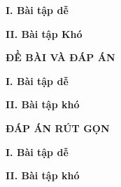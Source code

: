 \documentclass[12pt]{article}
\begin{document}
\setlength{\baselineskip}{12truept}
\def\v#1{\overrightarrow{#1}} %

% 
\lamtieude

\indebai

\textbf{I. Bài tập dễ}
\begin{enumerate}[]
\foreachproblem[dtracnghiem]{\item\causo\thisproblem}

 \textbf{II. Bài tập Khó}

\foreachproblem[ktracnghiem]{\item\causo\thisproblem}
\end{enumerate}
\label{dbPage}

\newpage
\setcounter{page}{1}
\lamtieude
\begin{center}
{\bf ĐỀ BÀI VÀ ĐÁP ÁN }
\end{center}
\indebaidapan

\textbf{I. Bài tập dễ}
\begin{enumerate}[]
\foreachproblem[dtracnghiem]{\item\causo\thisproblem}

\hspace{-1.5cm}
\textbf{II. Bài tập khó}

\foreachproblem[ktracnghiem]{\item\causo\thisproblem}
\end{enumerate}

\newpage
\lamtieude
\thispagestyle{empty}
\begin{center}
{\bf ĐÁP ÁN RÚT GỌN}
\end{center}
\indapanrutgon
\textbf{I. Bài tập dễ}
\begin{enumerate}[\causo]
\begin{multicols}{3}
\foreachproblem[dtracnghiem]{\item\thisproblem}
\end{multicols}

\hspace{-1.5cm}
\textbf{II. Bài tập khó}

\begin{multicols}{3}
\foreachproblem[ktracnghiem]{\item\thisproblem}
\end{multicols}
\end{enumerate}

\newpage
\lamphieuthi
 \inphieuthi
\begin{multicols}{3}
\begin{enumerate}[\causo]
 \foreachproblem[dtracnghiem]{\item\thisproblem}
 \foreachproblem[ktracnghiem]{\item\thisproblem}
\end{enumerate}
\end{multicols}
\addtocounter{page}{-2}
\end{document}
